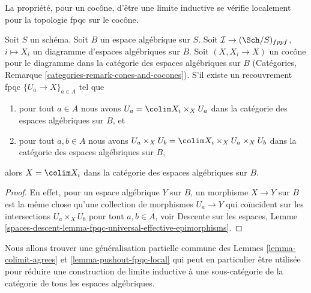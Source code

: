 \noindent
La propriété, pour un cocône, d'être une limite inductive se vérifie localement pour la topologie fpqc sur le cocône.

\begin{lemma}
\label{lemma-pushout-fpqc-local}
Soit $S$ un schéma. Soit $B$ un espace algébrique sur $S$.
Soit $\mathcal{I} \to (\Sch/S)_{fppf}$, $i \mapsto X_i$
un diagramme d'espaces algébriques sur $B$. Soit $(X, X_i \to X)$
un cocône pour le diagramme dans la catégorie des espaces algébriques sur $B$
(Catégories, Remarque \ref{categories-remark-cones-and-cocones}).
S'il existe un recouvrement fpqc $\{U_a \to X\}_{a \in A}$ tel que
\begin{enumerate}
\item pour tout $a \in A$ nous avons
$U_a = \colim X_i \times_X U_a$
dans la catégorie des espaces algébriques sur $B$, et
\item pour tout $a, b \in A$ nous avons
$U_a \times_X U_b = \colim X_i \times_X U_a \times_X U_b$
dans la catégorie des espaces algébriques sur $B$,
\end{enumerate}
alors $X = \colim X_i$ dans la catégorie des espaces algébriques sur $B$.
\end{lemma}

\begin{proof}
En effet, pour un espace algébrique $Y$ sur $B$, un morphisme $X \to Y$ sur $B$
est la même chose qu'une collection de morphismes $U_a \to Y$ qui coïncident sur
les intersections $U_a \times_X U_b$ pour tout $a, b \in A$, voir
Descente sur les espaces, Lemme
\ref{spaces-descent-lemma-fpqc-universal-effective-epimorphisms}.
\end{proof}

\noindent
Nous allons trouver une généralisation partielle commune des
Lemmes \ref{lemma-colimit-agrees} et \ref{lemma-pushout-fpqc-local}
qui peut en particulier être utilisée pour réduire une construction de limite inductive à une
sous-catégorie de la catégorie de tous les espaces algébriques.

